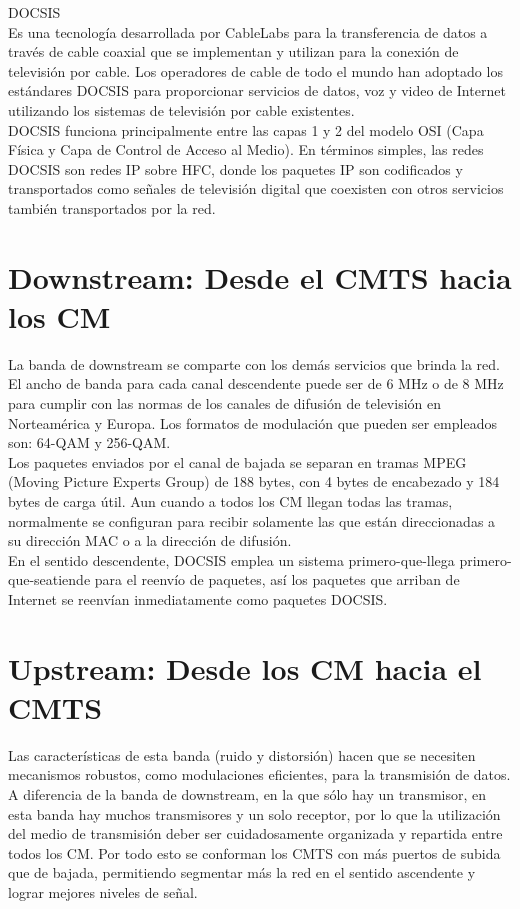 {\color{red} DOCSIS}\\

Es una tecnología desarrollada por CableLabs para la transferencia de datos a través de cable coaxial que se implementan y utilizan para la conexión de televisión por cable. Los operadores de cable de todo el mundo han adoptado los estándares DOCSIS para proporcionar servicios de datos, voz y video de Internet utilizando los sistemas de televisión por cable existentes.\\

DOCSIS funciona principalmente entre las capas 1 y 2 del modelo OSI (Capa Física y Capa de Control de Acceso al Medio). En términos simples, las redes DOCSIS son redes IP sobre HFC, donde los paquetes IP son codificados y transportados como señales de televisión digital que coexisten con otros servicios también transportados por la red. 

\section*{Downstream: Desde el CMTS hacia los CM}
La banda de downstream se comparte con los demás servicios que brinda la red. El ancho de banda para cada canal descendente puede ser de 6 MHz o de 8 MHz para cumplir con las normas de los canales de difusión de televisión en Norteamérica y Europa. Los formatos de modulación que pueden ser empleados son: 64-QAM y 256-QAM. \\

Los paquetes enviados por el canal de bajada se separan en tramas MPEG (Moving Picture Experts Group) de 188 bytes, con 4 bytes de encabezado y 184 bytes de carga útil. Aun cuando a todos los CM llegan todas las tramas, normalmente se configuran para recibir solamente las que están direccionadas a su dirección MAC o a la dirección de difusión. \\

En el sentido descendente, DOCSIS emplea un sistema primero-que-llega primero-que-seatiende para el reenvío de paquetes, así los paquetes que arriban de Internet se reenvían inmediatamente como paquetes DOCSIS.

\section*{Upstream: Desde los CM hacia el CMTS}

Las características de esta banda (ruido y distorsión) hacen que se necesiten mecanismos robustos, como modulaciones eficientes, para la transmisión de datos. A diferencia de la banda de downstream, en la que sólo hay un transmisor, en esta banda hay muchos transmisores y un solo receptor, por lo que la utilización del medio de transmisión deber ser cuidadosamente organizada y repartida entre todos los CM. Por todo esto se conforman los CMTS con más puertos de subida que de bajada, permitiendo segmentar más la red en el sentido ascendente y lograr mejores niveles de señal.\\

